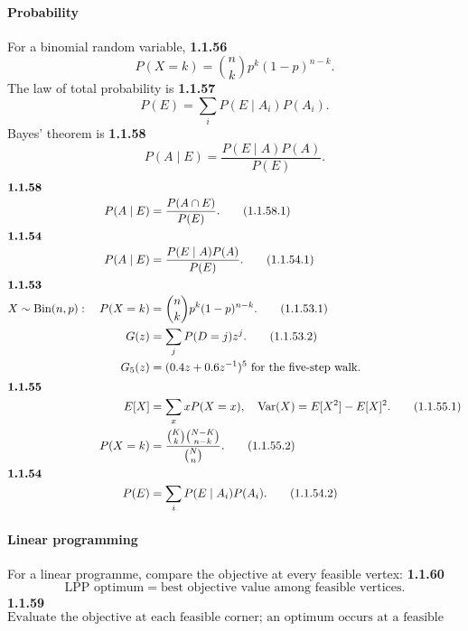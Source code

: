 \paragraph*{Probability}
For a binomial random variable,
\noindent\textbf{1.1.56}\quad
\begin{equation}
P(X=k)=\binom nkp^k(1-p)^{n-k}.\tag{1.1.56.1}\label{eq:binomial-56}
\end{equation}
The law of total probability is
\noindent\textbf{1.1.57}\quad
\begin{equation}
P(E)=\sum_iP(E\mid A_i)P(A_i).\tag{1.1.57.1}\label{eq:total-probability-57}
\end{equation}
Bayes' theorem is
\noindent\textbf{1.1.58}\quad
\begin{equation}
P(A\mid E)=\frac{P(E\mid A)P(A)}{P(E)}.\tag{1.1.58.2}\label{eq:bayes-58-2}
\end{equation}
\begin{align}\intertext{\textbf{1.1.58}}
P(A\mid E)&=\frac{P(A\cap E)}{P(E)}. \tag{1.1.58.1}\\
\intertext{\textbf{1.1.54}}
P(A\mid E)&=\frac{P(E\mid A)P(A)}{P(E)}. \tag{1.1.54.1}\\
\intertext{\textbf{1.1.53}}
X\sim\operatorname{Bin}(n,p):\quad P(X=k)&=\binom nkp^k(1-p)^{n-k}. \tag{1.1.53.1}\label{eq:binomial-53}\\
G(z)&=\sum_jP(D=j)z^j. \tag{1.1.53.2}\label{eq:walk-pgf}\\
G_5(z)&=(0.4z+0.6z^{-1})^5 \text{ for the five-step walk}. \notag\\
\intertext{\textbf{1.1.55}}
E[X]&=\sum_x xP(X=x),\quad \operatorname{Var}(X)=E[X^2]-E[X]^2. \tag{1.1.55.1}\label{eq:mean-variance-55}\\
P(X=k)&=\frac{\binom{K}{k}\binom{N-K}{n-k}}{\binom Nn}. \tag{1.1.55.2}\label{eq:hypergeometric-55}\\
\intertext{\textbf{1.1.54}}
P(E)&=\sum_iP(E\mid A_i)P(A_i). \tag{1.1.54.2}
\end{align}

\paragraph*{Linear programming}
For a linear programme, compare the objective at every feasible vertex:
\noindent\textbf{1.1.60}\quad
\begin{equation}
\text{LPP optimum}=\text{best objective value among feasible vertices}.\tag{1.1.60.1}\label{eq:lpp-60}
\end{equation}
\noindent\textbf{1.1.59}\quad
\[\text{Evaluate the objective at each feasible corner; an optimum occurs at a feasible vertex.}\tag{1.1.59.1}\]

